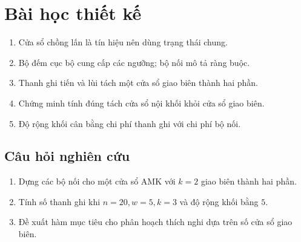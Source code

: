 \section{Bài học thiết kế}

\begin{summarybox}
\begin{enumerate}
  \item Cửa sổ chồng lấn là tín hiệu nên dùng trạng thái chung.
  \item Bộ đếm cục bộ cung cấp các ngưỡng; bộ nối mô tả ràng buộc.
  \item Thanh ghi tiến và lùi tách một cửa sổ giao biên thành hai phần.
  \item Chứng minh tính đúng tách cửa sổ nội khối khỏi cửa sổ giao biên.
  \item Độ rộng khối cân bằng chi phí thanh ghi với chi phí bộ nối.
\end{enumerate}
\end{summarybox}

\subsection*{Câu hỏi nghiên cứu}
\begin{enumerate}
  \item Dựng các bộ nối cho một cửa sổ AMK với \(k=2\) giao biên thành hai phần.
  \item Tính số thanh ghi khi \(n=20,w=5,k=3\) và độ rộng khối bằng \(5\).
  \item Đề xuất hàm mục tiêu cho phân hoạch thích nghi dựa trên số cửa sổ giao biên.
\end{enumerate}
